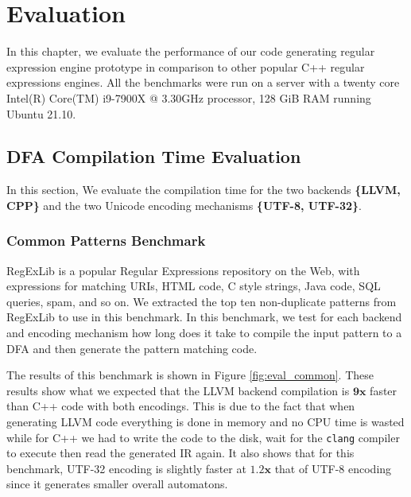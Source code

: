 \chapter{Evaluation}\label{chapter:evaluation}
In this chapter, we evaluate the performance of our code generating regular expression engine prototype in comparison to other popular C++ regular expressions engines. All the benchmarks were run on a server with a twenty core Intel(R) Core(TM) i9-7900X @ 3.30GHz processor, 128 GiB RAM running Ubuntu 21.10.

\newcommand\rownumberone{\stepcounter{magicrownumbers1}\arabic{magicrownumbers1}}
\newcommand\rownumbertwo{\stepcounter{magicrownumbers2}\arabic{magicrownumbers2}}

\section{DFA Compilation Time Evaluation}
In this section, We evaluate the compilation time for the two backends \textbf{\{LLVM, CPP\}} and the two Unicode encoding mechanisms \textbf{\{UTF-8, UTF-32\}}.

\subsection{Common Patterns Benchmark}
RegExLib \cite{regexlib} is a popular Regular Expressions repository on the Web, with expressions for matching URIs, HTML code, C style strings, Java code, SQL queries, spam, and so on. We extracted the top ten non-duplicate patterns from RegExLib to use in this benchmark. In this benchmark, we test for each backend and encoding mechanism how long does it take to compile the input pattern to a DFA and then generate the pattern matching code. 

The results of this benchmark is shown in Figure \ref{fig:eval_common}. These results show what we expected that the LLVM backend compilation is $\mathbf{9x}$ faster than C++ code with both encodings. This is due to the fact that when generating LLVM code everything is done in memory and no CPU time is wasted while for C++ we had to write the code to the disk, wait for the \texttt{clang} compiler to execute then read the generated IR again. It also shows that for this benchmark, UTF-32 encoding is slightly faster at $\mathbf{1.2x}$ that of UTF-8 encoding since it generates smaller overall automatons.


